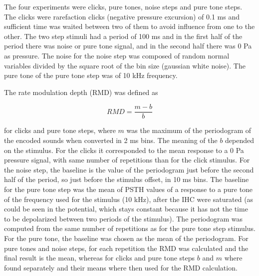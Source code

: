 The four experiments were clicks, pure tones, noise steps and pure tone steps.
The clicks were rarefaction clicks (negative pressure excursion) of 0.1 ms and sufficient time was waited between 
two of them to avoid influence from one to the other.
The two step stimuli had a period of 100 ms and in the first half of the period 
there was noise or pure tone signal, and in the second half there was 0 Pa as pressure.
The noise for the noise step was composed of random normal variables divided 
by the square root of the bin size (gaussian white noise).
The pure tone of the pure tone step was of 10 kHz frequency.

The rate modulation depth (RMD) was defined as 

\begin{equation}\label{rmdformula1} RMD =  \frac{m - b}{b}\end{equation}

%
%
for clicks and pure tone steps,
where $m$ was 
the maximum of the periodogram of the encoded sounds when converted in 2 ms bins.
The meaning of the $b$ depended on the stimulus. 
For the clicks it corresponded to the mean response to a 0 Pa pressure signal,
 with same number of repetitions than for the click stimulus. 
For the noise step, the baseline is the value of the periodogram just before the second 
half of the period, so just before the stimulus offset,
 in 10 ms bins. 
The baseline for the pure tone step was the mean of PSTH values
of a response to a pure tone of the frequency used for the stimulus (10 kHz),
after the IHC were saturated (as could be seen in the potential, 
which stays constant because it has not the time 
to be depolarized between two periods of the stimulus). 
The periodogram was computed from the same number of repetitions as for the pure tone step stimulus.
For the pure tone, the baseline was chosen as the mean of the periodogram.
For pure tones and noise steps, for each repetition the RMD was calculated and the final result is the mean, whereas
for clicks and pure tone steps $b$ and $m$ where found separately and their means where then used for the RMD calculation.

